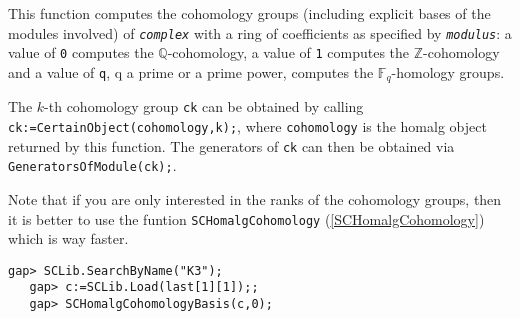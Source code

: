 \documentclass[a4paper,11pt]{report}
\begin{document}
{{{ This function computes the cohomology groups (including explicit bases of the
modules involved) of \mbox{\texttt{\mdseries\slshape complex}} with a ring of coefficients as specified by \mbox{\texttt{\mdseries\slshape modulus}}: a value of \texttt{0} computes the $\mathbb{Q}$-cohomology, a value of \texttt{1} computes the $\mathbb{Z}$-cohomology and a value of \texttt{q}, q a prime or a prime power, computes the $\mathbb{F}_q$-homology groups.

 The $k$-th cohomology group \texttt{ck} can be obtained by calling \texttt{ck:=CertainObject(cohomology,k);}, where \texttt{cohomology} is the \textsf{homalg} object returned by this function. The generators of \texttt{ck} can then be obtained via \texttt{GeneratorsOfModule(ck);}.

 Note that if you are only interested in the ranks of the cohomology groups,
then it is better to use the funtion \texttt{SCHomalgCohomology} (\ref{SCHomalgCohomology}) which is way faster. 
\begin{Verbatim}[commandchars=!@|,fontsize=\small,frame=single,label=Example]
   gap> SCLib.SearchByName("K3");
   gap> c:=SCLib.Load(last[1][1]);;
   gap> SCHomalgCohomologyBasis(c,0);
   
\end{Verbatim}
 }

 }

 }

 
\end{document}

